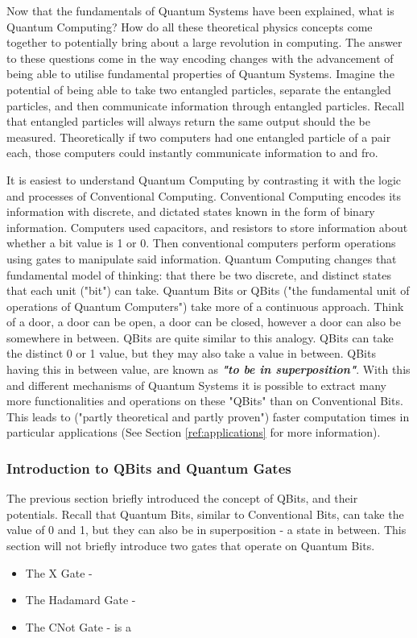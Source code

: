 \documentclass[a4paper]{article}
\begin{document}
Now that the fundamentals of Quantum Systems have been explained, what is Quantum Computing? How do all these theoretical physics concepts come together to potentially bring about a large revolution in computing. The answer to these questions come in the way encoding changes with the advancement of being able to utilise fundamental properties of Quantum Systems. Imagine the potential of being able to take two entangled particles, separate the entangled particles, and then communicate information through entangled particles. Recall that entangled particles will always return the same output should the be measured. Theoretically if two computers had one entangled particle of a pair each, those computers could instantly communicate information to and fro.

It is easiest to understand Quantum Computing by contrasting it with the logic and processes of Conventional Computing. Conventional Computing encodes its information with discrete, and dictated states known in the form of binary information. Computers used capacitors, and resistors to store information about whether a bit value is 1 or 0. Then conventional computers perform operations using gates to manipulate said information. Quantum Computing changes that fundamental model of thinking: that there be two discrete, and distinct states that each unit ("bit") can take. Quantum Bits or QBits ("the fundamental unit of operations of Quantum Computers") take more of a continuous approach. Think of a door, a door can be open, a door can be closed, however a door can also be somewhere in between. QBits are quite similar to this analogy. QBits can take the distinct 0 or 1 value, but they may also take a value in between. QBits having this in between value, are known as \textbf{\textit{"to be in superposition"}}. With this and different mechanisms of Quantum Systems it is possible to extract many more functionalities and operations on these "QBits" than on Conventional Bits. This leads to ("partly theoretical and partly proven") faster computation times in particular applications (See Section \ref{ref:applications} for more information).

\subsubsection{Introduction to QBits and Quantum Gates}

The previous section briefly introduced the concept of QBits, and their potentials. Recall that Quantum Bits, similar to Conventional Bits, can take the value of 0 and 1, but they can also be in superposition - a state in between. This section will not briefly introduce two gates that operate on Quantum Bits.
\begin{itemize}
	\item The X Gate -
	\item The Hadamard Gate -
	\item The CNot Gate - is a
\end{itemize}
\end{document}
